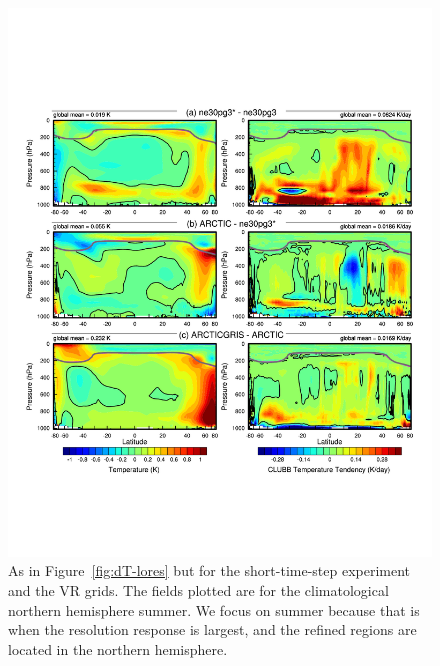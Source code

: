 \documentclass[draft]{agujournal2019}
\begin{document}
\begin{figure}[t]
\begin{center}
         \includegraphics[width=130mm]{figs/temp_dhgt_panel_STEND_CLUBB-hires.pdf}
\end{center}
\caption{As in Figure~\ref{fig:dT-lores} but for the short-time-step experiment and the VR grids. The fields plotted are for the climatological northern hemisphere summer. We focus on summer because that is when the resolution response is largest, and the refined regions are located in the northern hemisphere.}
\label{fig:dT-hires}
\end{figure}
\end{document}

